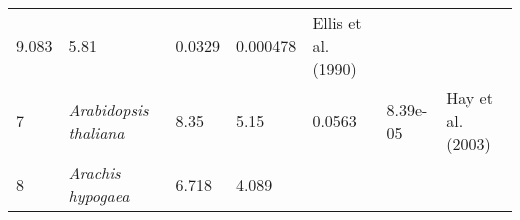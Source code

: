 \documentclass[]{article}
\begin{document}
\begin{longtable}[]{@{}lllllll@{}}
\begin{minipage}[t]{0.05\columnwidth}
9.083\strut
\end{minipage} & \begin{minipage}[t]{0.08\columnwidth}\raggedright
5.81\strut
\end{minipage} & \begin{minipage}[t]{0.08\columnwidth}\raggedright
0.0329\strut
\end{minipage} & \begin{minipage}[t]{0.08\columnwidth}\raggedright
0.000478\strut
\end{minipage} & \begin{minipage}[t]{0.23\columnwidth}\raggedright
Ellis et al. (1990)\strut
\end{minipage}\tabularnewline
\begin{minipage}[t]{0.05\columnwidth}\raggedright
7\strut
\end{minipage} & \begin{minipage}[t]{0.23\columnwidth}\raggedright
\emph{Arabidopsis thaliana}\strut
\end{minipage} & \begin{minipage}[t]{0.05\columnwidth}\raggedright
8.35\strut
\end{minipage} & \begin{minipage}[t]{0.08\columnwidth}\raggedright
5.15\strut
\end{minipage} & \begin{minipage}[t]{0.08\columnwidth}\raggedright
0.0563\strut
\end{minipage} & \begin{minipage}[t]{0.08\columnwidth}\raggedright
8.39e-05\strut
\end{minipage} & \begin{minipage}[t]{0.23\columnwidth}\raggedright
Hay et al. (2003)\strut
\end{minipage}\tabularnewline
\begin{minipage}[t]{0.05\columnwidth}\raggedright
8\strut
\end{minipage} & \begin{minipage}[t]{0.23\columnwidth}\raggedright
\emph{Arachis hypogaea}\strut
\end{minipage} & \begin{minipage}[t]{0.05\columnwidth}\raggedright
6.718\strut
\end{minipage} & \begin{minipage}[t]{0.08\columnwidth}\raggedright
4.089\strut
\end{minipage} & \begin{minipage}[t]{0.08\columnwidth}\raggedright

\end{minipage}
\end{longtable}
\end{document}
